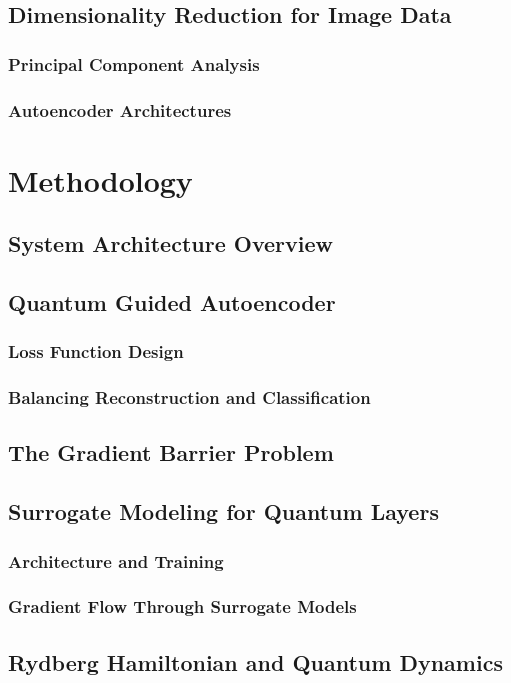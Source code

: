 \documentclass[conference]{IEEEtran}
\begin{document}
\subsection{Dimensionality Reduction for Image Data}
\subsubsection{Principal Component Analysis}
\subsubsection{Autoencoder Architectures}

\section{Methodology}
\subsection{System Architecture Overview}
\subsection{Quantum Guided Autoencoder}
\subsubsection{Loss Function Design}
\subsubsection{Balancing Reconstruction and Classification}
\subsection{The Gradient Barrier Problem}
\subsection{Surrogate Modeling for Quantum Layers}
\subsubsection{Architecture and Training}
\subsubsection{Gradient Flow Through Surrogate Models}
\subsection{Rydberg Hamiltonian and Quantum Dynamics}
\end{document}
